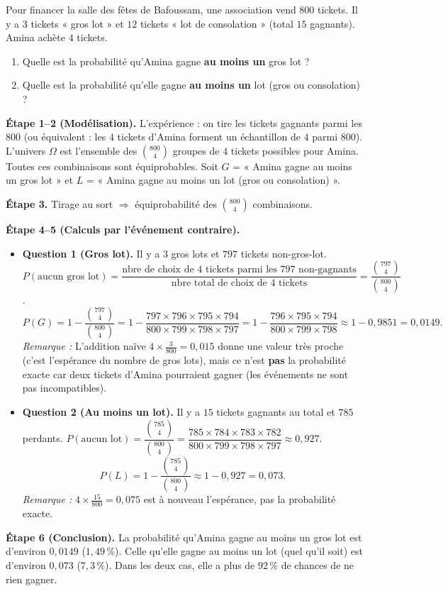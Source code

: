 \documentclass[11pt]{article}
\begin{document}
\begin{exoresolu}
Pour financer la salle des fêtes de Bafoussam, une association vend $800$ tickets. Il y a $3$ tickets « gros lot » et $12$ tickets « lot de consolation » (total $15$ gagnants). Amina achète $4$ tickets.
\begin{enumerate}
\item Quelle est la probabilité qu'Amina gagne \textbf{au moins un} gros lot ?
\item Quelle est la probabilité qu'elle gagne \textbf{au moins un} lot (gros ou consolation) ?
\end{enumerate}
\tcblower
\textbf{Étape 1--2 (Modélisation).} L'expérience : on tire les tickets gagnants parmi les $800$ (ou équivalent : les $4$ tickets d'Amina forment un échantillon de $4$ parmi $800$). L'univers $\Omega$ est l'ensemble des $\binom{800}{4}$ groupes de $4$ tickets possibles pour Amina. Toutes ces combinaisons sont équiprobables.
Soit $G$ = « Amina gagne au moins un gros lot » et $L$ = « Amina gagne au moins un lot (gros ou consolation) ».

\textbf{Étape 3.} Tirage au sort $\Rightarrow$ équiprobabilité des $\binom{800}{4}$ combinaisons.

\textbf{Étape 4--5 (Calculs par l'événement contraire).}
\begin{itemize}
\item \textbf{Question 1 (Gros lot).} Il y a $3$ gros lots et $797$ tickets non-gros-lot.
      $P(\text{aucun gros lot}) = \dfrac{\text{nbre de choix de 4 tickets parmi les 797 non-gagnants}}{\text{nbre total de choix de 4 tickets}} = \dfrac{\binom{797}{4}}{\binom{800}{4}}$.
      \[
      P(G) = 1 - \frac{\binom{797}{4}}{\binom{800}{4}}
           = 1 - \frac{797 \times 796 \times 795 \times 794}{800 \times 799 \times 798 \times 797}
           = 1 - \frac{796 \times 795 \times 794}{800 \times 799 \times 798}
           \approx 1 - 0{,}9851 = 0{,}0149.
      \]
      \textit{Remarque :} L'addition naïve $4 \times \frac{3}{800} = 0{,}015$ donne une valeur très proche (c'est l'espérance du nombre de gros lots), mais ce n'est \textbf{pas} la probabilité exacte car deux tickets d'Amina pourraient gagner (les événements ne sont pas incompatibles).
\item \textbf{Question 2 (Au moins un lot).} Il y a $15$ tickets gagnants au total et $785$ perdants.
      $P(\text{aucun lot}) = \dfrac{\binom{785}{4}}{\binom{800}{4}} = \dfrac{785 \times 784 \times 783 \times 782}{800 \times 799 \times 798 \times 797} \approx 0{,}927$.
      \[
      P(L) = 1 - \frac{\binom{785}{4}}{\binom{800}{4}} \approx 1 - 0{,}927 = 0{,}073.
      \]
      \textit{Remarque :} $4 \times \frac{15}{800} = 0{,}075$ est à nouveau l'espérance, pas la probabilité exacte.
\end{itemize}

\textbf{Étape 6 (Conclusion).} La probabilité qu'Amina gagne au moins un gros lot est d'environ $0{,}0149$ ($1{,}49\,\%$). Celle qu'elle gagne au moins un lot (quel qu'il soit) est d'environ $0{,}073$ ($7{,}3\,\%$). Dans les deux cas, elle a plus de $92\,\%$ de chances de ne rien gagner.
\end{exoresolu}
\end{document}
